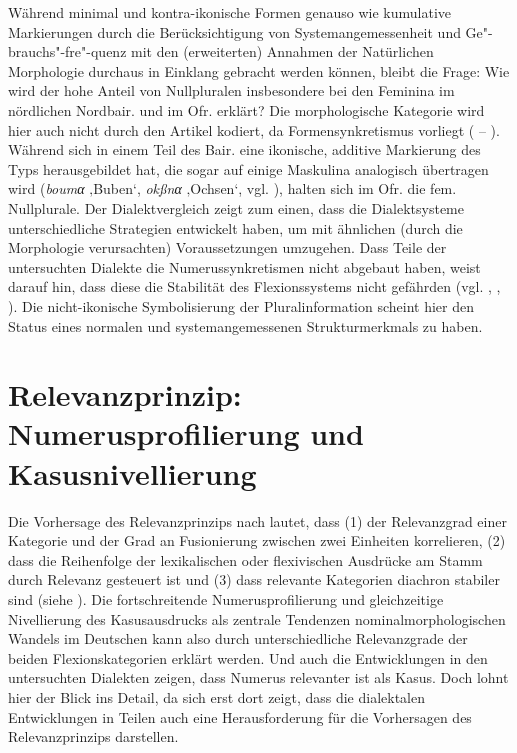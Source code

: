 \begin{sloppypar}
Während minimal und kontra-ikonische Formen genauso wie kumulative Markierungen durch die Berücksichtigung von Systemangemessenheit und Ge"-brauchs"-fre"-quenz mit den (erweiterten) Annahmen der Natürlichen Morphologie durchaus in Einklang gebracht werden können, bleibt die Frage: Wie wird der hohe Anteil von Nullpluralen insbesondere bei den Feminina im nördlichen Nordbair. und im Ofr. erklärt? Die morphologische Kategorie wird hier auch nicht durch den Artikel kodiert, da Formensynkretismus vorliegt (  --  ). Während sich in einem Teil des Bair. eine ikonische, additive Markierung des Typs  herausgebildet hat, die sogar auf einige Maskulina analogisch übertragen wird (\textit{boumα} ‚Buben‘, \textit{okßnα} ‚Ochsen‘, vgl. \citealt[149]{Wildfeuer2001}), halten sich im Ofr. die fem. Nullplurale. Der Dialektvergleich zeigt zum einen, dass die Dialektsysteme unterschiedliche Strategien entwickelt haben, um mit ähnlichen (durch die Morphologie verursachten) Voraussetzungen umzugehen. Dass Teile der untersuchten Dialekte die Numerussynkretismen nicht abgebaut haben, weist darauf hin, dass diese die Stabilität des Flexionssystems nicht gefährden (vgl. \citealt[181]{HarnischRowley1990}, \citealt[145]{Mauser1998a}, \citealt[200]{Rowley1997}). Die nicht-ikonische Symbolisierung der Pluralinformation scheint hier den Status eines normalen und systemangemessenen Strukturmerkmals zu haben.
\end{sloppypar}

\section{Relevanzprinzip: Numerusprofilierung und Kasusnivellierung}
\label{sec:10.2}
Die Vorhersage des Relevanzprinzips nach \citet{Bybee1985b} lautet, dass
(1) der Relevanzgrad einer Kategorie und der Grad an Fusionierung zwischen zwei Einheiten korrelieren,
(2) dass die Reihenfolge der lexikalischen oder flexivischen Ausdrücke am Stamm durch Relevanz gesteuert ist und
(3) dass relevante Kategorien diachron stabiler sind (siehe ). Die fortschreitende Numerusprofilierung und gleichzeitige Nivellierung des Kasusausdrucks als zentrale Tendenzen nominalmorphologischen Wandels im Deutschen kann also durch unterschiedliche Relevanzgrade der beiden Flexionskategorien erklärt werden. Und auch die Entwicklungen in den untersuchten Dialekten zeigen, dass Numerus relevanter ist als Kasus. Doch lohnt hier der Blick ins Detail, da sich erst dort zeigt, dass die dialektalen Entwicklungen in Teilen auch eine Herausforderung für die Vorhersagen des Relevanzprinzips darstellen.

